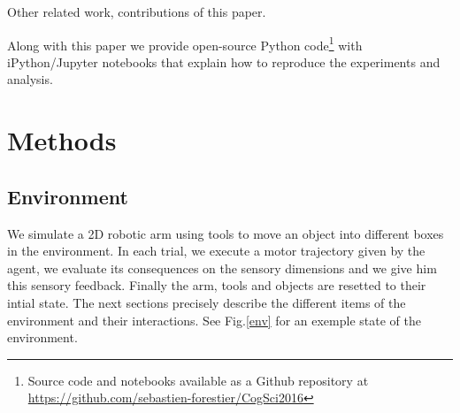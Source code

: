 \documentclass[10pt,letterpaper]{article}
\begin{document}
	Other related work, contributions of this paper.
	\cite{ugur2015}
	\cite{schmerlinggoal}
	\cite{forestier2015}
	\cite{unifying}

	Along with this paper we provide open-source Python code\footnote{Source code and notebooks available as a Github repository at \url{https://github.com/sebastien-forestier/CogSci2016}} 
	with iPython/Jupyter notebooks that explain how to reproduce the experiments and analysis. 
	
	
%

\section{Methods}

	\subsection{Environment}
	
		We simulate a 2D robotic arm using tools to move an object into different boxes in the environment. 		
		In each trial, we execute a motor trajectory given by the agent, we evaluate its consequences on the sensory dimensions and we give him
		this sensory feedback. Finally the arm, tools and objects are resetted to their intial state.
		The next sections precisely describe the different items of the environment and their interactions.	
		See Fig.\ref{env} for an exemple state of the environment. 
		
\end{document}
